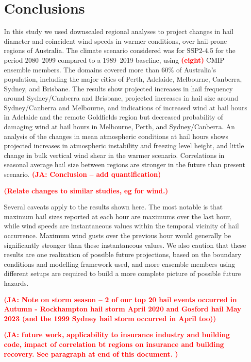\documentclass[]{agujournal2019}\usepackage[]{graphicx}\usepackage[]{xcolor}
\newcommand*{\todo}[1]{\textbf{\textcolor{red}{(#1)}}}
\begin{document}
\section{Conclusions}

In this study we used downscaled regional analyses to project changes in hail
diameter and coincident wind speeds in warmer conditions, over hail-prone
regions of Australia. The climate scenario considered was for SSP2-4.5 for the
period 2080--2099 compared to a 1989--2019 baseline, using \todo{eight} CMIP
ensemble members. The domains covered more than 60\% of Australia's population,
including the major cities of Perth, Adelaide, Melbourne, Canberra, Sydney, and
Brisbane. The results show projected increases in hail frequency around
Sydney/Canberra and Brisbane, projected increases in hail size around
Sydney/Canberra and Melbourne, and indications of increased wind at hail hours
in Adelaide and the remote Goldfields region but decreased probability of
damaging wind at hail hours in Melbourne, Perth, and Sydney/Canberra. An
analysis of the changes in mean atmospheric conditions at hail hours shows
projected increases in atmospheric instability and freezing level height, and
little change in bulk vertical wind shear in the warmer scenario. Correlations
in seasonal average hail size between regions are stronger in the future than
present scenario. \todo{JA: Conclusion – add quantification}

\todo{Relate changes to similar studies, eg for wind.}

Several caveats apply to the results shown here. The most notable is that
maximum hail sizes reported at each hour are maximums over the last hour, while
wind speeds are instantaneous values within the temporal vicinity of hail
occurrence. Maximum wind gusts over the previous hour would generally be
significantly stronger than these instantaneous values. We also caution that
these results are one realization of possible future projections, based on the
boundary conditions and modelling framework used, and more ensemble members
using different setups are required to build a more complete picture of possible
future hazards.

\todo{JA: Note on storm season – 2 of our top 20 hail events occurred in Autumn
- Rockhampton hail storm April 2020 and Gosford hail May 2023 (and the 1999
Sydney hail storm occurred in April too)}

\todo{JA: future work, applicability to insurance industry and building code,
impact of correlation bt regions on insurance and building recovery. See
paragraph at end of this document. }
\end{document}
